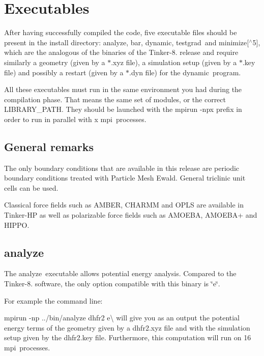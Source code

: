 \section*{Executables}

After having successfully compiled the code, five executable files should be present in the install directory\-: {\ttfamily analyze}, {\ttfamily bar}, {\ttfamily dynamic}, {\ttfamily testgrad} and {\ttfamily minimize}\mbox{[}$^\wedge$5\mbox{]}, which are the analogous of the binaries of the Tinker-\/8. release and require similarly a geometry (given by a $\ast$.xyz file), a simulation setup (given by a $\ast$.key file) and possibly a restart (given by a $\ast$.dyn file) for the {\ttfamily dynamic} program.

All these executables must run in the same environment you had during the compilation phase. That means the same set of modules, or the correct {\ttfamily L\-I\-B\-R\-A\-R\-Y\-\_\-\-P\-A\-T\-H}. They should be launched with the {\ttfamily mpirun -\/np}{\ttfamily x} prefix in order to run in parallel with {\ttfamily x} mpi processes.

\subsection*{General remarks}

The only boundary conditions that are available in this release are periodic boundary conditions treated with Particle Mesh Ewald. General triclinic unit cells can be used.

Classical force fields such as A\-M\-B\-E\-R, C\-H\-A\-R\-M\-M and O\-P\-L\-S are available in Tinker-\/\-H\-P as well as polarizable force fields such as A\-M\-O\-E\-B\-A, A\-M\-O\-E\-B\-A+ and H\-I\-P\-P\-O.

\subsection*{{\ttfamily analyze} }

The {\ttfamily analyze} executable allows potential energy analysis. Compared to the Tinker-\/8. software, the only option compatible with this binary is \char`\"{}e\char`\"{}.

For example the command line\-:


\begin{DoxyItemize}
\item {\ttfamily mpirun -\/np}{ ../bin/analyze dhfr2 e}\textbackslash{} will give you as an output the potential energy terms of the geometry given by a dhfr2.\-xyz file and with the simulation setup given by the dhfr2.\-key file. Furthermore, this computation will run on 16 mpi processes.
\end{DoxyItemize}

